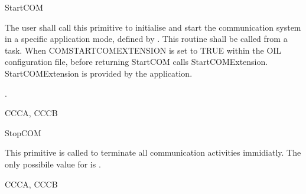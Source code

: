 \begin{function}{StartCOM}
  \begin{fundescription}
    The user shall call this primitive to initialise and start the  communication 
    system in a specific application mode, defined by . This routine 
    shall be called from a task. When COMSTARTCOMEXTENSION  is set to TRUE 
    within the OIL configuration file, before returning StartCOM calls 
    StartCOMExtension. StartCOMExtension is provided by the application.  
  \end{fundescription}
  \begin{funparameters}
  \end{funparameters}
  \begin{funreturn}
    .
  \end{funreturn}
  \begin{funconformance}
    CCCA, CCCB
  \end{funconformance}
\end{function}

\begin{function}{StopCOM}
  \begin{fundescription}
    This primitive is called to terminate all communication activities immidiatly. 
    The only possibile value for  is . 
  \end{fundescription}
  \begin{funparameters}
  \end{funparameters}
  \begin{funreturn}
  \end{funreturn}
  \begin{funconformance}
    CCCA, CCCB
  \end{funconformance}
\end{function}


